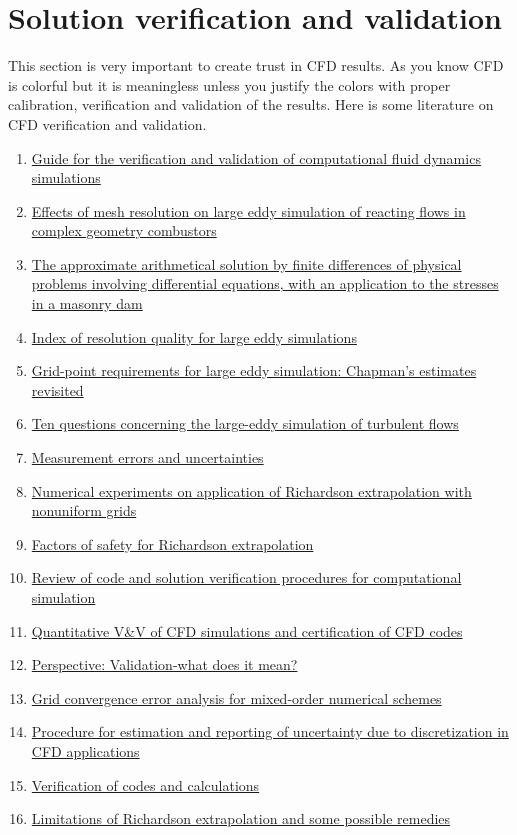 \documentclass[subscriptcorrection,upint,varvw,mathalfa=cal=euler,barcolor=black,balance,hyphenate,french,pdf-a,nolists]{asmejour}
\begin{document}
\section{Solution verification and validation}
\label{sec:2a}
This section is very important to create trust in CFD results. As you know CFD is colorful but it is meaningless unless you justify the colors with proper calibration, verification and validation of the results. Here is some literature on CFD verification and validation.
\begin{enumerate}
    \item \href{http://dx.doi.org/10.2514/4.472855.001}{Guide for the verification and validation of computational fluid dynamics simulations}
    \item \href{http://dx.doi.org/10.1016/j.combustflame.2008.04.013}{Effects of mesh resolution on large eddy simulation of reacting flows in complex geometry combustors}
    \item \href{http://dx.doi.org/10.1098/rsta.1911.0009}{The approximate arithmetical solution by finite differences of physical problems involving differential equations, with an application to the stresses in a masonry dam}
    \item \href{http://dx.doi.org/10.1115/1.1990201}{Index of resolution quality for large eddy simulations}
    \item \href{http://dx.doi.org/10.1063/1.3676783}{Grid-point requirements for large eddy simulation: Chapman’s estimates revisited}
    \item \href{http://dx.doi.org/10.1088/1367-2630/6/1/035}{Ten questions concerning the large-eddy simulation of turbulent flows}
    \item \href{http://dx.doi.org/10.1007/0-387-29143-1}{Measurement errors and uncertainties}
    \item \href{http://dx.doi.org/10.1115/1.2819284}{Numerical experiments on application of Richardson extrapolation with nonuniform grids}
    \item \href{http://dx.doi.org/10.1115/1.4001771}{Factors of safety for Richardson extrapolation}
    \item \href{http://dx.doi.org/10.1016/j.jcp.2004.10.036}{Review of code and solution verification procedures for computational simulation}
    \item \href{http://dx.doi.org/10.1002/fld.1090}{Quantitative V\&V of CFD simulations and certification of CFD codes}
    \item \href{http://dx.doi.org/10.1115/1.3077134}{Perspective: Validation-what does it mean?}
    \item \href{http://dx.doi.org/10.2514/2.2013}{Grid convergence error analysis for mixed-order numerical schemes}
    \item \href{http://dx.doi.org/10.1115/1.2960953}{Procedure for estimation and reporting of uncertainty due to discretization in CFD applications}
    \item \href{http://dx.doi.org/10.2514/2.457}{Verification of codes and calculations}
    \item \href{http://dx.doi.org/10.1115/1.1949646}{Limitations of Richardson extrapolation and some possible remedies}
\end{enumerate}
\end{document}
